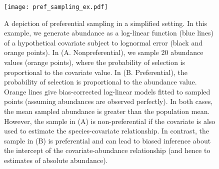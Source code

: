 \documentclass[times,mee,doublespace,]{besauth2}
\begin{document}
\begin{figure}
\begin{center}
\texttt{[image: pref\_sampling\_ex.pdf]}
\caption{A depiction of preferential sampling in a simplified setting. In this example, we generate abundance as a log-linear function (blue lines) of a hypothetical covariate subject to lognormal error (black and orange points).  In (A. Nonpreferential), we sample 20 abundance values (orange points), where the probability of selection is proportional to the covariate value. In (B. Preferential), the probability of selection is proportional to the abundance value. Orange lines give bias-corrected log-linear models fitted to sampled points (assuming abundances are observed perfectly).  In both cases, the mean sampled abundance is greater than the population mean. However, the sample in (A) is non-preferential if the covariate is also used to estimate the species-covariate relationship.  In contrast, the sample in (B) is preferential and can lead to biased inference about the intercept of the covariate-abundance relationship (and hence to estimates of absolute abundance).}
\label{fig:PS_example}
\end{center}
\end{figure}
\end{document}
